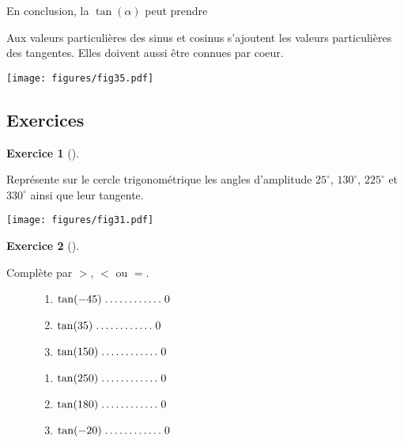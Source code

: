 \documentclass[
  a4paper,
  DIV=11,
  numbers=noendperiod,
  oneside]{scrreprt}
\theoremstyle{definition}
\theoremstyle{definition}
\newtheorem{exercise}{Exercice}[chapter]
\theoremstyle{plain}
\theoremstyle{definition}
\theoremstyle{remark}
\begin{document}
En conclusion, la \(\tan(\alpha)\) peut prendre \dotfill

Aux valeurs particulières des sinus et cosinus s'ajoutent les valeurs
particulières des tangentes. Elles doivent aussi être connues par coeur.

\begin{center}
\texttt{[image: figures/fig35.pdf]}
\end{center}

\subsection{Exercices}\label{exercices-2}

\begin{exercise}[]\protect\hypertarget{exr-}{}\label{exr-}

Représente sur le cercle trigonométrique les angles d'amplitude
\(25^\circ\), \(130^\circ\), \(225^\circ\) et \(330^\circ\) ainsi que
leur tangente.

\begin{center}
\texttt{[image: figures/fig31.pdf]}
\end{center}

\end{exercise}

\begin{exercise}[]\protect\hypertarget{exr-}{}\label{exr-}

Complète par \(>\), \(<\) ou \(=\).

\begin{figure}

\begin{minipage}{0.60\linewidth}

\begin{enumerate}
\def\labelenumi{\arabic{enumi})}
\item
  \(\tan(-45)\makebox[2cm]{\dotfill}0\)
\item
  \(\tan(35)\makebox[2cm]{\dotfill}0\)
\item
  \(\tan(150)\makebox[2cm]{\dotfill}0\)
\end{enumerate}

\end{minipage}%
%
\begin{minipage}{0.40\linewidth}

\begin{enumerate}
\def\labelenumi{\arabic{enumi})}
\item
  \(\tan(250)\makebox[2cm]{\dotfill}0\)
\item
  \(\tan(180)\makebox[2cm]{\dotfill}0\)
\item
  \(\tan(-20)\makebox[2cm]{\dotfill}0\)
\end{enumerate}

\end{minipage}%

\end{figure}%

\end{exercise}
\end{document}
